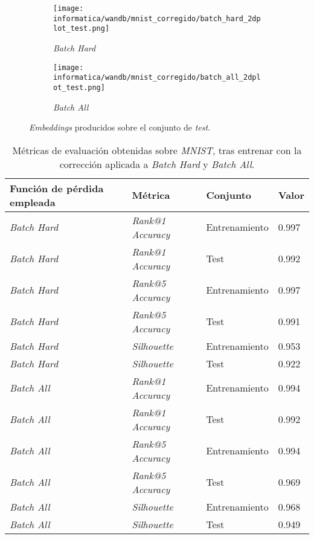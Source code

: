 \begin{figure}[!hbtp]
\centering
    \begin{subfigure}{.5\textwidth}
        \centering
        \texttt{[image: informatica/wandb/mnist\_corregido/batch\_hard\_2dplot\_test.png]}
        \caption{\textit{Batch Hard}}
    \end{subfigure}%
    \begin{subfigure}{.5\textwidth}
        \centering
        \texttt{[image: informatica/wandb/mnist\_corregido/batch\_all\_2dplot\_test.png]}
        \caption{\textit{Batch All}}
    \end{subfigure}
\caption{\textit{Embeddings} producidos sobre el conjunto de \textit{test}.}
\label{img:mnist_corregido_embeddings_aprendidos}
\end{figure}

\begin{table}[!hbtp]
    \centering
    \begin{tabular}{|l|l|l|l|}
        \hline
        Función de pérdida empleada & Métrica &  Conjunto & Valor \\
        \hline

        \textit{Batch Hard} & \textit{Rank@1 Accuracy} & Entrenamiento & 0.997 \\
        \textit{Batch Hard} & \textit{Rank@1 Accuracy} & Test & 0.992  \\
        \textit{Batch Hard} & \textit{Rank@5 Accuracy} & Entrenamiento & 0.997  \\
        \textit{Batch Hard} & \textit{Rank@5 Accuracy} & Test & 0.991 \\
        \textit{Batch Hard} & \textit{Silhouette} & Entrenamiento & 0.953 \\
        \textit{Batch Hard} & \textit{Silhouette} & Test & 0.922 \\
        \hline
        \textit{Batch All} & \textit{Rank@1 Accuracy} & Entrenamiento & 0.994 \\
        \textit{Batch All} & \textit{Rank@1 Accuracy} & Test & 0.992  \\
        \textit{Batch All} & \textit{Rank@5 Accuracy} & Entrenamiento & 0.994  \\
        \textit{Batch All} & \textit{Rank@5 Accuracy} & Test & 0.969 \\
        \textit{Batch All} & \textit{Silhouette} & Entrenamiento & 0.968 \\
        \textit{Batch All} & \textit{Silhouette} & Test & 0.949 \\


        \hline

    \end{tabular}
    \caption{Métricas de evaluación obtenidas sobre \textit{MNIST}, tras entrenar con la corrección aplicada a \textit{Batch Hard} y \textit{Batch All}.}
    \label{table:resultados_mnist_corregido}
\end{table}


